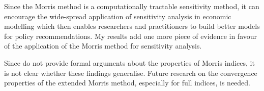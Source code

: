 
Since the Morris method is a computationally tractable sensitivity method, it can encourage the wide-spread application of sensitivity analysis in economic modelling which then enables researchers and practitioners to build better models for policy recommendations. My results add one more piece of evidence in favour of the application of the Morris method for sensitivity analysis.


Since \citet{GM17} do not provide formal arguments about the properties of Morris indices, it is not clear whether these findings generalise. Future research on the convergence properties of the extended Morris method, especially for full indices, is needed.

